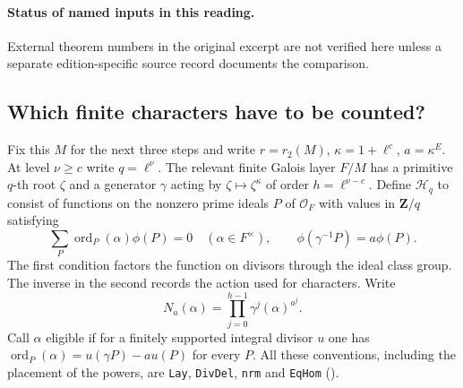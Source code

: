 

\paragraph{Status of named inputs in this reading.}
External theorem numbers in the original excerpt are not verified here unless a separate edition-specific source record documents the comparison.

\subsection{Which finite characters have to be counted?}

Fix this $M$ for the next three steps and write $r=r_2(M)$,
$\kappa=1+\ell^c$, $a=\kappa^E$. At level $\nu\ge c$ write $q=\ell^\nu$.
The relevant finite Galois layer $F/M$ has a primitive $q$-th root $\zeta$
and a generator $\gamma$ acting by $\zeta\mapsto\zeta^\kappa$ of order
$h=\ell^{\nu-c}$. Define $\mathcal H_q$ to consist of functions on the
nonzero prime ideals $P$ of $\mathcal O_F$ with values in $\mathbf Z/q$
satisfying
\[
 \sum_P \operatorname{ord}_P(\alpha)\phi(P)=0\quad(\alpha\in F^\times),
 \qquad \phi(\gamma^{-1}P)=a\phi(P).
\]
The first condition factors the function on divisors through the ideal
class group. The inverse in the second records the action used for
characters. Write
\[
 N_a(\alpha)=\prod_{j=0}^{h-1} \gamma^j(\alpha)^{a^j}.
\]
Call $\alpha$ eligible if for a finitely supported integral divisor $u$
one has $\operatorname{ord}_P(\alpha)=u(\gamma P)-a u(P)$ for every $P$.
All these conventions, including the placement of the powers, are
\nolinkurl{Lay}, \nolinkurl{DivDel}, \nolinkurl{nrm} and
\nolinkurl{EqHom} ().

